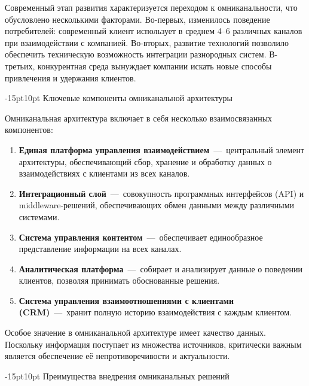 \documentclass[12pt,a4paper]{report}
\makeatletter
\renewcommand{\section}{%
  \@startsection{section}{1}{\z@}%
  {-15pt}{10pt}%
  {\centering\normalfont\bfseries\large}}
\makeatother
\begin{document}
Современный этап развития характеризуется переходом к омниканальности, что обусловлено несколькими факторами. Во-первых, изменилось поведение потребителей: современный клиент использует в среднем 4--6 различных каналов при взаимодействии с компанией. Во-вторых, развитие технологий позволило обеспечить техническую возможность интеграции разнородных систем. В-третьих, конкурентная среда вынуждает компании искать новые способы привлечения и удержания клиентов.

\section{Ключевые компоненты омниканальной архитектуры}

Омниканальная архитектура включает в себя несколько взаимосвязанных компонентов:

\begin{enumerate}
    \item \textbf{Единая платформа управления взаимодействием}~---~центральный элемент архитектуры, обеспечивающий сбор, хранение и обработку данных о взаимодействиях с клиентами из всех каналов.

    \item \textbf{Интеграционный слой}~---~совокупность программных интерфейсов (API) и middleware-решений, обеспечивающих обмен данными между различными системами.

    \item \textbf{Система управления контентом}~---~обеспечивает единообразное представление информации на всех каналах.

    \item \textbf{Аналитическая платформа}~---~собирает и анализирует данные о поведении клиентов, позволяя принимать обоснованные решения.

    \item \textbf{Система управления взаимоотношениями с клиентами (CRM)}~---~хранит полную историю взаимодействия с каждым клиентом.
\end{enumerate}

Особое значение в омниканальной архитектуре имеет качество данных. Поскольку информация поступает из множества источников, критически важным является обеспечение её непротиворечивости и актуальности.

\section{Преимущества внедрения омниканальных решений}
\end{document}
